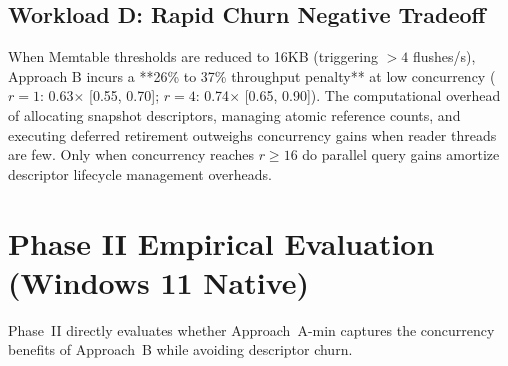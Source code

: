 \documentclass[conference]{IEEEtran}
\begin{document}
\subsection{Workload D: Rapid Churn Negative Tradeoff}
When Memtable thresholds are reduced to 16KB (triggering $>4$ flushes/s), Approach B incurs a **26\% to 37\% throughput penalty** at low concurrency ($r=1$: 0.63$\times$ [0.55, 0.70]; $r=4$: 0.74$\times$ [0.65, 0.90]). The computational overhead of allocating snapshot descriptors, managing atomic reference counts, and executing deferred retirement outweighs concurrency gains when reader threads are few. Only when concurrency reaches $r \ge 16$ do parallel query gains amortize descriptor lifecycle management overheads.

\section{Phase II Empirical Evaluation (Windows 11 Native)}

Phase~II directly evaluates whether Approach~A-min captures the concurrency benefits of Approach~B while avoiding descriptor churn.
\end{document}
